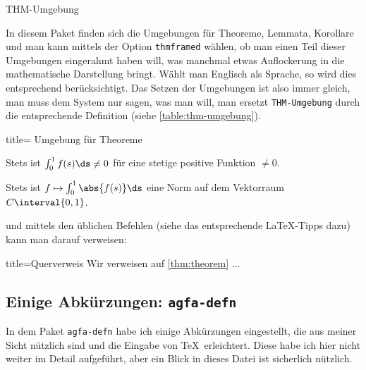 %
\begin{docEnvironment}{THM-Umgebung}{}
\end{docEnvironment}
%

In diesem Paket finden sich die Umgebungen für Theoreme, Lemmata, Korollare \etc und man kann mittels der Option \texttt{thmframed} wählen, ob man einen Teil dieser Umgebungen eingerahmt haben will, was manchmal etwas Auflockerung in die mathematische Darstellung bringt.
Wählt man Englisch als Sprache, so wird dies entsprechend berücksichtigt.
Das Setzen der Umgebungen ist also immer gleich, man muss dem System nur sagen, was man will, \dh man ersetzt \texttt{THM-Umgebung} durch die entsprechende Definition (siehe \vref{table:thm-umgebung}). 

\begin{tcblisting}{title= Umgebung für Theoreme}
%
\begin{theorem}\label{thm:theorem}
Stets ist $ \int_{ 0 }^{ 1 } f(s) \ds \neq 0 $ für eine stetige positive Funktion $ \neq 0 $.
\end{theorem}
%
\begin{corollary}\label{cor:folgerung}
Stets ist $ f \mapsto \int_{ 0 }^{ 1 } \abs{ f(s) }\ds $ eine Norm auf dem Vektorraum 
$ C\interval{0,1} $.
\end{corollary}
%
\end{tcblisting}
%
und mittels den üblichen Befehlen (siehe das entsprechende \LaTeX{}-Tipps dazu) kann man darauf verweisen:
%
\begin{tcblisting}{title=Querverweis} 
Wir verweisen auf \vref{thm:theorem} ...
\end{tcblisting}
%
%
\subsection{Einige Abkürzungen: \texttt{agfa-defn}}\label{agfa-defn}
In dem Paket \texttt{agfa-defn} habe ich einige Abkürzungen eingestellt, die aus meiner Sicht nützlich sind und die Eingabe von \TeX\ erleichtert.
Diese habe ich hier nicht weiter im Detail aufgeführt, aber ein Blick in dieses Datei ist sicherlich nützlich.

